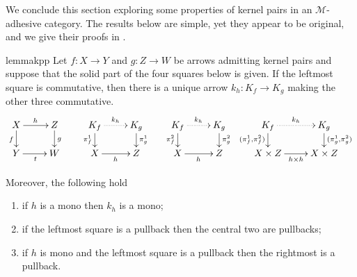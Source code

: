 \documentclass[a4paper,UKenglish,cleveref,pdftex,thm-restate,numberwithinsect]{lipics-v2021}
\def\D{\textbf {\textup{D}}}
\def\X{\textbf {\textup{X}}}
\newcommand{\commentato}[1]{ {} }
\begin{document}
\commentato{ 
\begin{restatable}{corollary}{natepi}\label{cor:reg_epi_components_reg_epi_nat_trans}
    Let $\X$ be a category with pullbacks and $\phi\colon F \to G$ a natural transformation between functors $F, G: \D \rightrightarrows \X$. If $\phi_d$ is a regular epi for every $d$, then $\phi$ is a regular epi.
\end{restatable}

From the previous result we deduce that the class of regular epis is closed under colimits.

\begin{restatable}{lemma}{epicol}\label{lemma:nat_trans_reg_epi_canonical_arrow_reg_epi}
    Let $F,G\colon \D\rightrightarrows \X$ be two diagrams, and suppose that $\X$ has all colimits of shape $\D$. Let $(X, \{x_d\}_{d \in \D})$ and $(Y, \{y_d\}_{d\in D})$ be the colimits of $F$ and $G$, respectively.  If $\phi\colon  F \to G$ is a natural transformation whose components are regular epis, then the arrow induced by $\phi$ from $X$ to $Y$ is a regular epi.
\end{restatable}
}
We conclude this section exploring some properties of kernel pairs in an $\mathcal{M}$-adhesive category. 
The results below are simple, yet they appear to be original, and we give their proofs in .

\begin{restatable}{lemma}{kpp}\label{lemma:kern_pairs_pres_pullbacks}
	Let $f\colon X \to Y$ and $g\colon Z \to W$ be arrows admitting kernel pairs and suppose that the solid part of the four squares below is given. 
	If the leftmost square is commutative, then there is a unique arrow $k_h\colon K_f \to K_g$ making the other three commutative.
	\[\xymatrix@R=15pt{X \ar[r]^{h}\ar[d]_{f}& Z \ar[d]^{g} & K_f \ar@{.>}[r]^{k_h} \ar[d]_{\pi^1_f}& K_g \ar[d]^{\pi^1_g} & K_f  \ar@{.>}[r]^{k_h} \ar[d]_{\pi^2_f}& K_g \ar[d]^{\pi^2_g}& K_f  \ar@{.>}[r]^{k_h} \ar[d]_{(\pi^1_f,\pi^2_f)} & K_g \ar[d]^{(\pi^1_g, \pi^2_g)}\\ Y \ar[r]_t& W & X \ar[r]_{h} & Z & X\ar[r]_{h} &Z & X\times Z \ar[r]_{h\times h}& X\times Z}\]
	
		Moreover, the following hold
		\begin{enumerate}
			\item if $h$ is a mono then $k_h$ is a mono;
			\item if the leftmost square is a pullback then the central two are pullbacks;
			\item if $h$ is mono and the leftmost square is a pullback then the rightmost is a pullback.
		\end{enumerate} 
\end{restatable}
\end{document}

